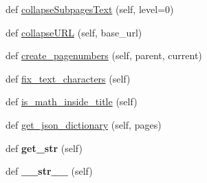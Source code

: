 \begin{DoxyCompactItemize}
\item 
def \hyperlink{classtexla_1_1PageTree_1_1Page_1_1Page_a6d435028bd474b1b36abdbd4387fd08f}{collapse\+Subpages\+Text} (self, level=0)
\item 
def \hyperlink{classtexla_1_1PageTree_1_1Page_1_1Page_ab9d5fa24adb9159e80a0e5253f501622}{collapse\+U\+RL} (self, base\+\_\+url)
\item 
def \hyperlink{classtexla_1_1PageTree_1_1Page_1_1Page_a4c813de1c404e86c8e55c73e017ad4b2}{create\+\_\+pagenumbers} (self, parent, current)
\item 
def \hyperlink{classtexla_1_1PageTree_1_1Page_1_1Page_aac15419ccf4b4ca1d50dc91dc2fc8e20}{fix\+\_\+text\+\_\+characters} (self)
\item 
def \hyperlink{classtexla_1_1PageTree_1_1Page_1_1Page_a83054589cb1c1f29959693ac9ab8fd93}{is\+\_\+math\+\_\+inside\+\_\+title} (self)
\item 
def \hyperlink{classtexla_1_1PageTree_1_1Page_1_1Page_a2a63bd250b119f66631c4129ed982093}{get\+\_\+json\+\_\+dictionary} (self, pages)
\item 
\hypertarget{classtexla_1_1PageTree_1_1Page_1_1Page_ad67d6552dd5d4e781fe823b059d2aa78}{}\label{classtexla_1_1PageTree_1_1Page_1_1Page_ad67d6552dd5d4e781fe823b059d2aa78} 
def {\bfseries get\+\_\+str} (self)
\item 
\hypertarget{classtexla_1_1PageTree_1_1Page_1_1Page_a43f3989a712c7ae3101c96bc7753874b}{}\label{classtexla_1_1PageTree_1_1Page_1_1Page_a43f3989a712c7ae3101c96bc7753874b} 
def {\bfseries \+\_\+\+\_\+str\+\_\+\+\_\+} (self)
\end{DoxyCompactItemize}
